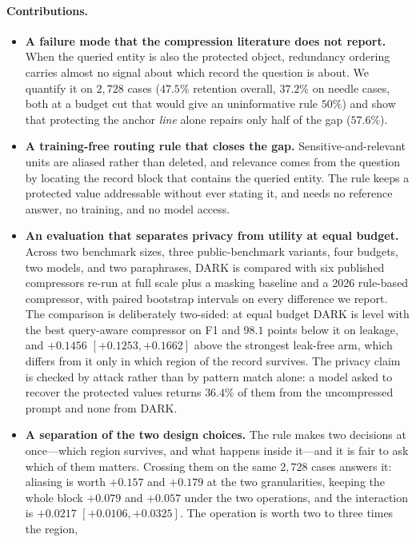 \paragraph{Contributions.}
\begin{itemize}
\item \textbf{A failure mode that the compression literature does not report.} When the
queried entity is also the protected object, redundancy ordering carries almost no signal
about which record the question is about. We quantify it on $2{,}728$ cases ($47.5\%$
retention overall, $37.2\%$ on needle cases, both at a budget cut that would give an
uninformative rule $50\%$) and show that protecting the anchor \emph{line} alone repairs only
half of the gap ($57.6\%$).
\item \textbf{A training-free routing rule that closes the gap.} Sensitive-and-relevant units
are aliased rather than deleted, and relevance comes from the question by locating the record
block that contains the queried entity. The rule keeps a protected value addressable without
ever stating it, and needs no reference answer, no training, and no model access.
\item \textbf{An evaluation that separates privacy from utility at equal budget.} Across two
benchmark sizes, three public-benchmark variants, four budgets, two models, and two
paraphrases, \textsc{DARK} is compared with six published compressors re-run at full scale
plus a masking baseline and a 2026 rule-based compressor, with paired bootstrap
intervals on every difference we report. The
comparison is deliberately two-sided: at equal budget \textsc{DARK} is level with the best
query-aware compressor on F1 and $98.1$ points below it on leakage, and $+0.1456$
$[+0.1253,+0.1662]$ above the strongest leak-free arm, which differs from it only in which
region of the record survives. The privacy claim is checked by attack rather than by pattern
match alone: a model asked to recover the protected values returns $36.4\%$ of them from the
uncompressed prompt and none from \textsc{DARK}.
\item \textbf{A separation of the two design choices.} The rule makes two decisions at once---which
region survives, and what happens inside it---and it is fair to ask which of them matters. Crossing
them on the same $2{,}728$ cases answers it: aliasing is worth $+0.157$ and $+0.179$ at the two
granularities, keeping the whole block $+0.079$ and $+0.057$ under the two operations, and the
interaction is $+0.0217$ $[+0.0106,+0.0325]$. The operation is worth two to three times the region,

\end{itemize}
